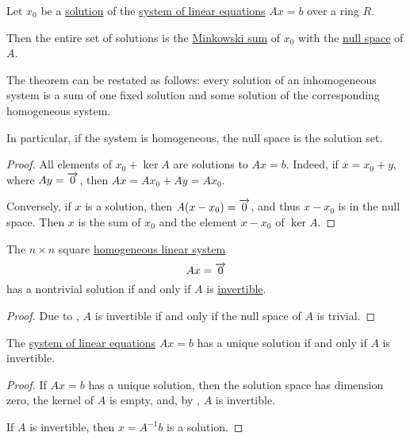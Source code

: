 \begin{proposition}\label{thm:linear_system_solutions}
  Let \( x_0 \) be a \hyperref[def:equation/solution]{solution} of the \hyperref[def:system_of_linear_equations]{system of linear equations} \( Ax = b \) over a ring \( R \).

  Then the entire set of solutions is the \hyperref[def:minkowski_sum]{Minkowski sum} of \( x_0 \) with the \hyperref[def:module/kernel]{null space} of \( A \).
\end{proposition}
\begin{comments}
  \item The theorem can be restated as follows: every solution of an inhomogeneous system is a sum of one fixed solution and some solution of the corresponding homogeneous system.

  \item In particular, if the system is homogeneous, the null space is the solution set.
\end{comments}
\begin{proof}
  All elements of \( x_0 + \ker A \) are solutions to \( Ax = b \). Indeed, if \( x = x_0 + y \), where \( Ay = \overrightarrow{0} \), then \( Ax = Ax_0 + Ay = Ax_0 \).

  Conversely, if \( x \) is a solution, then \( A(x - x_0) = \overrightarrow{0} \), and thus \( x - x_0 \) is in the null space. Then \( x \) is the sum of \( x_0 \) and the element \( x - x_0 \) of \( \ker A \).
\end{proof}

\begin{corollary}\label{thm:homogeneous_linear_equations_solutions}
  The \( n \times n \) square \hyperref[def:system_of_linear_equations/homogeneous]{homogeneous linear system}
  \begin{equation*}
    Ax = \overrightarrow{0}
  \end{equation*}
  has a nontrivial solution if and only if \( A \) is  \hyperref[def:inverse_matrix]{invertible}.
\end{corollary}
\begin{proof}
  Due to , \( A \) is invertible if and only if the null space of \( A \) is trivial.
\end{proof}

\begin{corollary}\label{thm:system_of_equations_unique_solution}
  The \hyperref[def:system_of_linear_equations]{system of linear equations} \( Ax = b \) has a unique solution if and only if \( A \) is invertible.
\end{corollary}
\begin{proof}
  \SufficiencySubProof If \( Ax = b \) has a unique solution, then the solution space has dimension zero, the kernel of \( A \) is empty, and, by , \( A \) is invertible.

  \NecessitySubProof If \( A \) is invertible, then \( x = A^{-1} b \) is a solution.
\end{proof}

